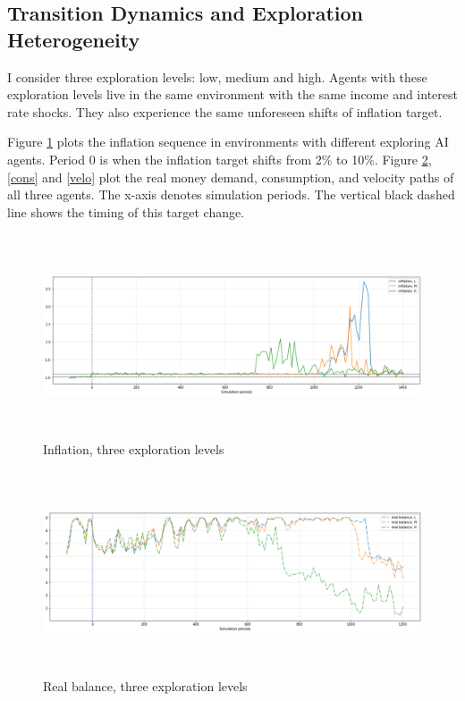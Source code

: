 \documentclass[hidelinks]{article}
\begin{document}

\subsection{Transition Dynamics and Exploration Heterogeneity}


I consider three exploration levels: low, medium and high. Agents with these exploration levels live in the same environment with the same income and interest rate shocks. They also experience the same unforeseen shifts of inflation target. 

Figure \ref{inf} plots the inflation sequence in environments with different exploring AI agents. Period 0 is when the inflation target shifts from 2\% to 10\%. Figure \ref{rms}, \ref{cons} and \ref{velo} plot the real money demand, consumption, and velocity paths of all three agents. The x-axis denotes simulation periods. The vertical black dashed line shows the timing of this target change. 


 

\begin{figure}[H]
	\caption{Inflation, three exploration levels}
	\centerline{\includegraphics[width=19cm,height=6cm]{inflation_full.png}}
	\label{inf}
\end{figure}


\begin{figure}[H]
	\caption{Real balance, three exploration levels}
	\centerline{\includegraphics[width=19cm,height=6cm]{realbalance.png}}
	\label{rms}
\end{figure}
\end{document}

